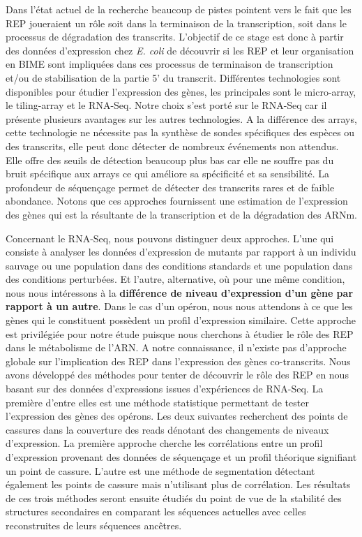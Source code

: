\documentclass[12pt,a4paper]{report}
\begin{document}
\begin{onehalfspace}
Dans l'état actuel de la recherche beaucoup de pistes pointent vers le fait que les REP joueraient un rôle soit dans la terminaison de la transcription, soit dans le processus de dégradation des transcrits. L'objectif de ce stage est donc à partir des données d'expression chez \textit{E. coli} de découvrir si les REP et leur organisation en BIME sont impliquées dans ces processus de terminaison de transcription et/ou de stabilisation de la partie 5' du transcrit. Différentes technologies sont disponibles pour étudier l'expression des gènes, les principales sont le micro-array, le \gls{tiling-array} et le \gls{RNA-Seq}. Notre choix s'est porté sur le RNA-Seq car il présente plusieurs avantages sur les autres technologies. A la différence des arrays, cette technologie ne nécessite pas la synthèse de sondes spécifiques des espèces ou des transcrits, elle peut donc détecter de nombreux événements non attendus. Elle offre des seuils de détection beaucoup plus bas car elle ne souffre pas du bruit spécifique aux arrays ce qui améliore sa spécificité et sa sensibilité. La profondeur de séquençage permet de détecter des transcrits rares et de faible abondance. Notons que ces approches fournissent une estimation de l'expression des gènes qui est la résultante de la transcription et de la dégradation des ARNm.

Concernant le RNA-Seq, nous pouvons distinguer deux approches. L'une qui consiste à analyser les données d'expression de mutants par rapport à un individu sauvage ou une population dans des conditions standards et une population dans des conditions perturbées. Et l'autre, alternative, où pour une même condition, nous nous intéressons à la \textbf{différence de niveau d'expression d'un gène par rapport à un autre}. Dans le cas d'un opéron, nous nous attendons à ce que les gènes qui le constituent possèdent un profil d'expression similaire. Cette approche est privilégiée pour notre étude puisque nous cherchons à étudier le rôle des REP dans le métabolisme de l'ARN.
A notre connaissance, il n'existe pas d'approche globale sur l'implication des REP dans l'expression des gènes co-transcrits. Nous avons développé des méthodes pour tenter de découvrir le rôle des REP en nous basant sur des données d'expressions issues d'expériences de RNA-Seq. La première d'entre elles est une méthode statistique permettant de tester l'expression des gènes des opérons. Les deux suivantes recherchent des points de cassures dans la couverture des reads dénotant des changements de niveaux d'expression. La première approche cherche les corrélations entre un profil d'expression provenant des données de séquençage et un profil théorique signifiant un point de cassure. L'autre est une méthode de segmentation détectant également les points de cassure mais n'utilisant plus de corrélation. Les résultats de ces trois méthodes seront ensuite étudiés du point de vue de la stabilité des structures secondaires en comparant les séquences actuelles avec celles reconstruites de leurs séquences ancêtres.



\end{onehalfspace}
\end{document}
